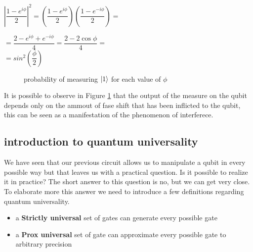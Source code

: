 \documentclass{article}
\begin{document}
$\left|\dfrac{1-e^{i\phi}}{2}\right|^2 = \left(\dfrac{1-e^{i\phi}}{2}\right)\left(\dfrac{1-e^{-i\phi}}{2}\right) =$\\
\vspace{5pt}


$ = \dfrac{2-e^{i\phi}+e^{-i\phi}}{4} = \dfrac{2-2\cos{\phi}}{4} =$\\

\vspace{3pt}
$ = sin^2{\left(\dfrac{\phi}{2}\right)}$

\vspace{10pt}



\begin{figure}[H]
	\centering
	\caption{probability of measuring $\ket{1}$ for each value of $\phi$}
	\label{interferencegraph}
\end{figure}

It is possible to observe in Figure \ref{interferencegraph}
that the output of the measure on the qubit depends only on the
ammout of fase shift that has been inflicted
to the qubit, this can be seen as a manifestation of the phenomenon
of interferece.



\subsection{introduction to quantum universality}

We have seen that our previous circuit allows us to manipulate a qubit
in every possible way but that leaves us with a practical question.
Is it possible to realize it in practice?
The short answer to this question is no, but we can get very close.
To elaborate more this answer we need to introduce a few definitions
regarding quantum universality.
\begin{itemize}

	\item
	      a \textbf{Strictly universal} set of gates can generate every possible gate


	\item
	      a \textbf{Prox universal} set of gate can approximate every possible gate to
	      arbitrary precision


\end{itemize}
\end{document}
